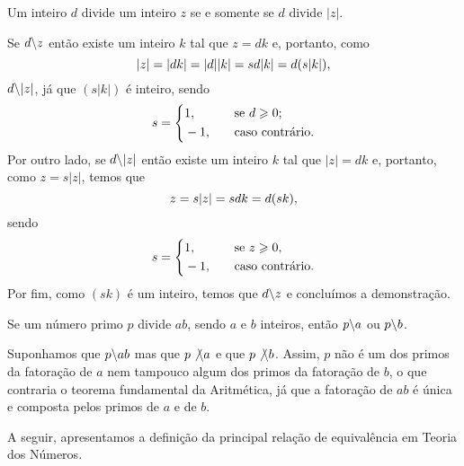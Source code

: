 \begin{Propr}
  Um inteiro $d$ divide um inteiro $z$ se e somente se $d$ divide
  $|z|$.
\end{Propr}

\begin{dem}
  Se $d\backslash z$ então existe um inteiro $k$
  tal que $z = dk$ e, portanto, como
  \begin{equation*}
    |z| = |dk| = |d||k| = sd|k| = d(s|k|)\mathrm{,}
  \end{equation*}
  $d\backslash |z|$, já que $(s|k|)$ é inteiro,
  sendo
  \begin{equation*}
    s = \left\{
    \begin{aligned}
      &1\mathrm{,}&\quad&\text{se $d\geqslant 0$;}\\
      &-1\mathrm{,}&\quad&\text{caso contrário.}
    \end{aligned}
    \right.
  \end{equation*}
  Por outro lado, se $d\backslash|z|$ então existe um inteiro $k$ tal que
  $|z| = dk$ e, portanto, como $z = s|z|$, temos que
  \begin{equation*}
    z = s|z| = sdk = d(sk)\mathrm{,}
  \end{equation*}
  sendo
  \begin{equation*}
    s = \left\{
    \begin{aligned}
      &1\mathrm{,}&\quad&\text{se $z\geqslant 0$,}\\
      &-1\mathrm{,}&\quad&\text{caso contrário.}
    \end{aligned}
    \right.
  \end{equation*}
  Por fim, como $(sk)$ é um inteiro,
  temos que $d\backslash z$ e concluímos a demonstração.
\end{dem}

\begin{Propr}\label{primodivide}
  Se um número primo $p$ divide $ab$, sendo $a$ e $b$ inteiros, então
  $p\backslash a$ ou $p\backslash b$.
\end{Propr}

\begin{dem}
  Suponhamos que
  $p\backslash ab$ mas que $p\not{\backslash} a$ e que $p\not{\backslash} b$. Assim, $p$ não é
  um dos primos da fatoração de $a$ nem tampouco algum dos primos da
  fatoração de $b$, o que contraria o teorema fundamental da Aritmética,
  já que a fatoração de $ab$ é única e composta pelos primos de $a$ e de
  $b$.
\end{dem}

A seguir, apresentamos a definição da principal relação de equivalência
em Teoria dos Números.

